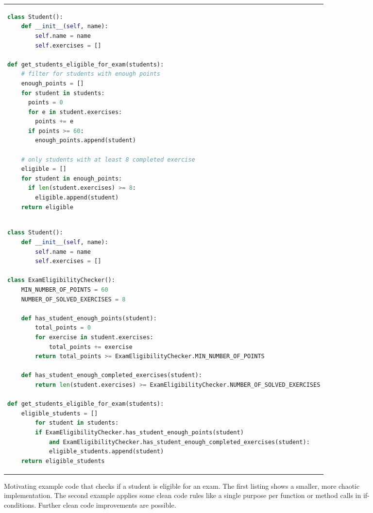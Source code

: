 \begin{figure}[h]
\begin{tabular}{p{\textwidth}}
\begin{minipage}{1\textwidth}
\centering
\begin{lstlisting}[basicstyle=\tiny, language=Python, label=lst:tokens_1, caption={}]
class Student():
    def __init__(self, name):
        self.name = name
        self.exercises = []

def get_students_eligible_for_exam(students):
    # filter for students with enough points
    enough_points = []
    for student in students:
      points = 0
      for e in student.exercises:
        points += e
      if points >= 60:
        enough_points.append(student)
    
    # only students with at least 8 completed exercise
    eligible = []
    for student in enough_points:
      if len(student.exercises) >= 8:
        eligible.append(student)
    return eligible
\end{lstlisting}
\end{minipage}
\\
\begin{minipage}[c]{1\textwidth}
\centering
\begin{lstlisting}[basicstyle=\tiny, language=Python, label=lst:tokens_2, caption={}]
class Student():
    def __init__(self, name):
        self.name = name
        self.exercises = []
    
class ExamEligibilityChecker():
    MIN_NUMBER_OF_POINTS = 60
    NUMBER_OF_SOLVED_EXERCISES = 8
    
    def has_student_enough_points(student):
        total_points = 0
        for exercise in student.exercises:
            total_points += exercise
        return total_points >= ExamEligibilityChecker.MIN_NUMBER_OF_POINTS
    
    def has_student_enough_completed_exercises(student):
        return len(student.exercises) >= ExamEligibilityChecker.NUMBER_OF_SOLVED_EXERCISES

def get_students_eligible_for_exam(students):
    eligible_students = []
        for student in students:
        if ExamEligibilityChecker.has_student_enough_points(student) 
            and ExamEligibilityChecker.has_student_enough_completed_exercises(student):
            eligible_students.append(student)
    return eligible_students    
\end{lstlisting}
\end{minipage}
\end{tabular}
\caption{Motivating example code that checks if a student is eligible for an exam. The first listing shows a smaller, more chaotic implementation. The second example applies some clean code rules like a single purpose per function or method calls in if-conditions. Further clean code improvements are possible.}
\label{list:motivating_example}
\end{figure}


